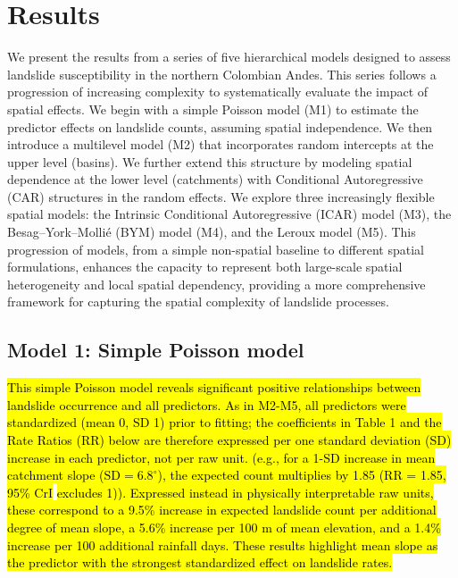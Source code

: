 \documentclass[journal abbreviation, manuscript]{copernicus}
\newcommand{\hlE}[1]{{\sethlcolor{edcyan}\hl{#1}}}
\begin{document}

\section{Results}\label{sec4}

We present the results from a series of five hierarchical models designed to assess landslide susceptibility in the northern Colombian Andes. 
This series follows a progression of increasing complexity to systematically evaluate the impact of spatial effects. 
We begin with a simple Poisson model (M1) to estimate the predictor effects on landslide counts, assuming spatial independence. 
We then introduce a multilevel model (M2) that incorporates random intercepts at the upper level (basins). 
We further extend this structure by modeling spatial dependence at the lower level (catchments) with Conditional Autoregressive (CAR) structures in the random effects. 
We explore three increasingly flexible spatial models: the Intrinsic Conditional Autoregressive (ICAR) model (M3), the Besag--York--Molli\'{e} (BYM) model (M4), and the Leroux model (M5). 
This progression of models, from a simple non-spatial baseline to different spatial formulations, enhances the capacity to represent both large-scale spatial heterogeneity and local spatial dependency, providing a more comprehensive framework for capturing the spatial complexity of landslide processes.

\subsection{Model 1: Simple Poisson model}\label{subsec41}

\hl{This simple Poisson model reveals significant positive relationships between landslide occurrence and all predictors. 
As in M2-M5, all predictors were standardized (mean 0, SD 1) prior to fitting; the coefficients in Table 1 and the Rate Ratios (RR) below are therefore expressed per one standard deviation (SD) increase in each predictor, not per raw unit. 
(e.g., for a 1-SD increase in mean catchment slope ($\mathrm{SD} = 6.8^{\circ}$), the expected count multiplies by 1.85 (RR = 1.85, 95\% CrI} \hlE{excludes 1))}\hl{.
Expressed instead in physically interpretable raw units, these correspond to a 9.5\% increase in expected landslide count per additional degree of mean slope, a 5.6\% increase per 100 m of mean elevation, and a 1.4\% increase per 100 additional rainfall days. 
These results highlight mean slope as the predictor with the strongest standardized effect on landslide rates.}
\end{document}
